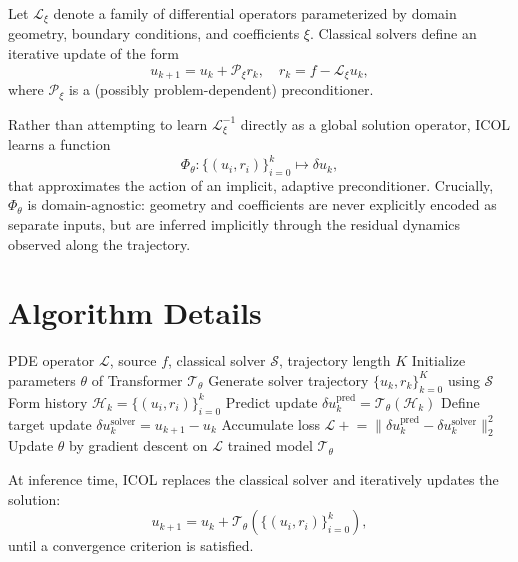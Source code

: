 \documentclass{article}
\begin{document}
Let $\mathcal{L}_\xi$ denote a family of differential operators parameterized by domain geometry, boundary conditions, and coefficients $\xi$. Classical solvers define an iterative update of the form
\begin{equation}
u_{k+1} = u_k + \mathcal{P}_\xi r_k, \quad r_k = f - \mathcal{L}_\xi u_k,
\end{equation}
where $\mathcal{P}_\xi$ is a (possibly problem-dependent) preconditioner.

Rather than attempting to learn $\mathcal{L}_\xi^{-1}$ directly as a global solution operator, ICOL learns a function
\begin{equation}
\Phi_\theta : \{(u_i, r_i)\}_{i=0}^k \mapsto \delta u_k,
\end{equation}
that approximates the action of an implicit, adaptive preconditioner. Crucially, $\Phi_\theta$ is domain-agnostic: geometry and coefficients are never explicitly encoded as separate inputs, but are inferred implicitly through the residual dynamics observed along the trajectory.

\section{Algorithm Details}
\label{app:algorithm}

\begin{algorithm}[h]
\caption{Training In-Context Operator Learning (ICOL)}
\begin{algorithmic}[1]
\REQUIRE PDE operator $\mathcal{L}$, source $f$, classical solver $\mathcal{S}$, trajectory length $K$
\STATE Initialize parameters $\theta$ of Transformer $\mathcal{T}_\theta$
    \STATE Generate solver trajectory $\{u_k, r_k\}_{k=0}^K$ using $\mathcal{S}$
        \STATE Form history $\mathcal{H}_k = \{(u_i, r_i)\}_{i=0}^k$
        \STATE Predict update $\delta u_k^{\text{pred}} = \mathcal{T}_\theta(\mathcal{H}_k)$
        \STATE Define target update $\delta u_k^{\text{solver}} = u_{k+1} - u_k$
        \STATE Accumulate loss $\mathcal{L} \mathrel{+}= \|\delta u_k^{\text{pred}} - \delta u_k^{\text{solver}}\|_2^2$
    \ENDFOR
\ENDFOR
\STATE Update $\theta$ by gradient descent on $\mathcal{L}$
\RETURN trained model $\mathcal{T}_\theta$
\end{algorithmic}
\end{algorithm}

At inference time, ICOL replaces the classical solver and iteratively updates the solution:
\begin{equation}
u_{k+1} = u_k + \mathcal{T}_\theta(\{(u_i, r_i)\}_{i=0}^k),
\end{equation}
until a convergence criterion is satisfied.
\end{document}
